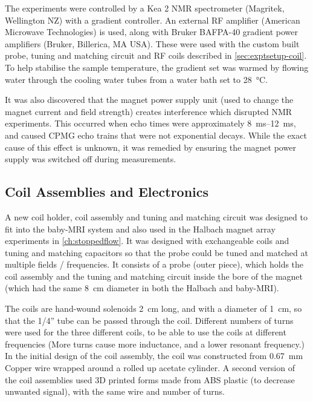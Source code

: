 The experiments were controlled by a Kea 2 NMR spectrometer (Magritek, Wellington NZ) with a gradient controller.
An external RF amplifier (American Microwave Technologies) is used, along with Bruker BAFPA-40 gradient power amplifiers (Bruker, Billerica, MA USA).
These were used with the custom built probe, tuning and matching circuit and RF coils described in \autoref{sec:exptsetup-coil}.
To help stabilise the sample temperature, the gradient set was warmed by flowing water through the cooling water tubes from a water bath set to \SI{28}{\celsius}.

It was also discovered that the magnet power supply unit (used to change the magnet current and field strength) creates interference which disrupted NMR experiments.
This occurred when echo times were approximately \SIrange{8}{12}{ms}, and caused CPMG echo trains that were not exponential decays.
While the exact cause of this effect is unknown, it was remedied by ensuring the magnet power supply was switched off during measurements.

\subsection{Coil Assemblies and Electronics}
\label{sec:exptsetup-coil}
A new coil holder, coil assembly and tuning and matching circuit was designed to fit into the baby-MRI system and also used in the Halbach magnet array experiments in  \autoref{ch:stoppedflow}.
It was designed with exchangeable coils and tuning and matching capacitors so that the probe could be tuned and matched at multiple fields / frequencies.
It consists of a probe (outer piece), which holds the coil assembly and the tuning and matching circuit inside the bore of the magnet (which had the same \SI{8}{cm} diameter in both the Halbach and baby-MRI).

The coils are hand-wound solenoids \SI{2}{cm} long, and with a diameter of \SI{1}{cm}, so that the 1/4'' tube can be passed through the coil.
Different numbers of turns were used for the three different coils, to be able to use the coils at different frequencies (More turns cause more inductance, and a lower resonant frequency.)
In the initial design of the coil assembly, the coil was constructed from \SI{0.67}{mm} Copper wire wrapped around a rolled up acetate cylinder.
A second version of the coil assemblies used 3D printed forms made from ABS plastic (to decrease unwanted signal), with the same wire and number of turns.

